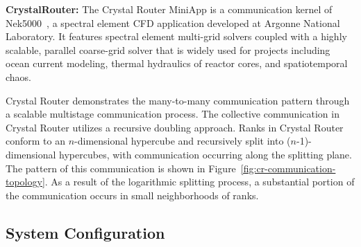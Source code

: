 \textbf{CrystalRouter:} The Crystal Router MiniApp is a communication kernel of Nek5000~\cite{nek5000}, a spectral element CFD application developed at Argonne National Laboratory. It features spectral element multi-grid solvers coupled with a highly scalable, parallel coarse-grid solver that is widely used for projects including ocean current modeling, thermal hydraulics of reactor cores, and spatiotemporal chaos. 

Crystal Router demonstrates the many-to-many communication pattern 
through a scalable multistage communication process. The collective communication in Crystal Router utilizes a recursive doubling approach. Ranks in Crystal Router conform to an $n$-dimensional hypercube and recursively split into ($n$-1)-dimensional hypercubes, with communication occurring along the splitting plane. The pattern of this communication is shown in Figure~\ref{fig:cr-communication-topology}. As a result of the logarithmic splitting process, a substantial portion of the communication occurs in small neighborhoods of ranks.



\subsection{System Configuration}
\label{sec: simulation configuration}

